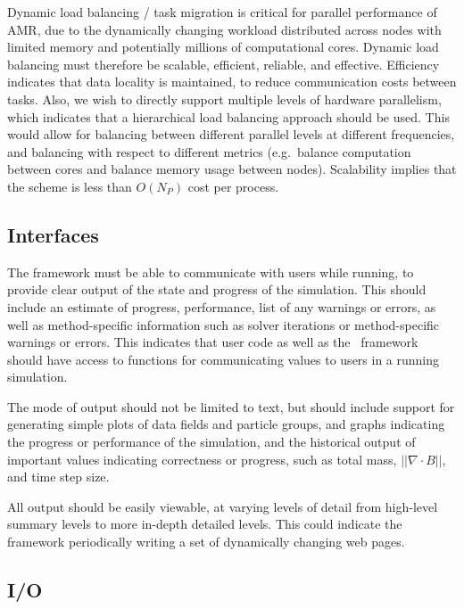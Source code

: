 \documentclass[10pt,twocolumn]{article}
\begin{document}
Dynamic load balancing / task migration is critical for parallel
performance of AMR, due to the dynamically changing workload
distributed across nodes with limited memory and potentially millions
of computational cores.  Dynamic load balancing must therefore be
scalable, efficient, reliable, and effective.  Efficiency indicates
that data locality is maintained, to reduce communication costs
between tasks.  Also, we wish to directly support multiple levels of
hardware parallelism, which indicates that a hierarchical load
balancing approach should be used.  This would allow for balancing
between different parallel levels at different frequencies, and
balancing with respect to different metrics (e.g.~balance computation
between cores and balance memory usage between nodes).  Scalability
implies that the scheme is less than $O(N_P)$ cost per process.

  
\subsection{Interfaces} \label{ss:require-interfaces}

The framework must be able to communicate with users while running, to
provide clear output of the state and progress of the simulation.
This should include an estimate of progress, performance, list of any
warnings or errors, as well as method-specific information such as
solver iterations or method-specific warnings or errors.  This
indicates that user code as well as the \cello\ framework should have
access to functions for communicating values to users in a running
simulation.

The mode of output should not be limited to text, but should include
support for generating simple plots of data fields and particle
groups, and graphs indicating the progress or performance of the
simulation, and the historical output of important values indicating
correctness or progress, such as total mass, $||\nabla \cdot B||$, and
time step size.

All output should be easily viewable, at varying levels of detail from
high-level summary levels to more in-depth detailed levels.  This
could indicate the framework periodically writing a set of dynamically
changing web pages.


\subsection{I/O } \label{ss:require-io}
\end{document}
